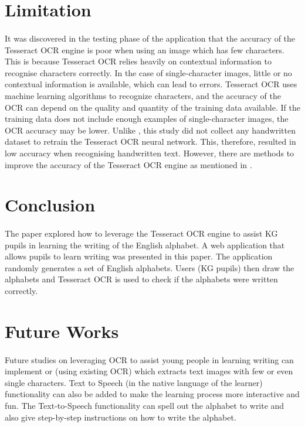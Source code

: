 \documentclass[twocolumn,oneside,12pt,a4paper]{article}
\begin{document}
\section{Limitation}
\paragraph*{}
It was discovered in the testing phase of the application that the accuracy of the Tesseract OCR engine is poor when using an image which has few characters. This is because Tesseract OCR relies heavily on contextual information to recognise characters correctly. In the case of single-character images, little or no contextual information is available, which can lead to errors.
Tesseract OCR uses machine learning algorithms to recognize characters, and the accuracy of the OCR can depend on the quality and quantity of the training data available. If the training data does not include enough examples of single-character images, the OCR accuracy may be lower. Unlike \cite{zin_handwritten_2021}, this study did not collect any handwritten dataset to retrain the Tesseract OCR neural network. This, therefore, resulted in low accuracy when recognising handwritten text.
However, there are methods to improve the accuracy of the Tesseract OCR engine as mentioned in \cite{hengaju_improving_2023,sporici_improving_2020}.

\section{Conclusion}
\paragraph*{}
The paper explored how to leverage the Tesseract OCR engine to assist KG pupils in learning the writing of the English alphabet. A web application that allows pupils to learn writing was presented in this paper. The application randomly generates a set of English alphabets. Users (KG pupils) then draw the alphabets and Tesseract OCR is used to check if the alphabets were written correctly.

\section{Future Works}
\paragraph*{}
Future studies on leveraging OCR to assist young people in learning writing can implement or (using existing OCR) which extracts text images with few or even single characters. Text to Speech (in the native language of the learner) functionality can also be added to make the learning process more interactive and fun. The Text-to-Speech functionality can spell out the alphabet to write and also give step-by-step instructions on how to write the alphabet.

\clearpage


\end{document}
